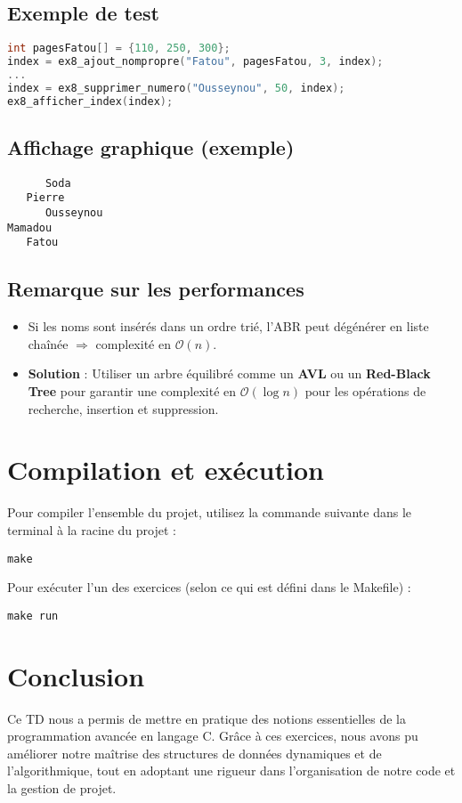 \documentclass[a4paper,12pt]{article}
\begin{document}
\subsection*{Exemple de test}

\begin{lstlisting}[language=C]
int pagesFatou[] = {110, 250, 300};
index = ex8_ajout_nompropre("Fatou", pagesFatou, 3, index);
...
index = ex8_supprimer_numero("Ousseynou", 50, index);
ex8_afficher_index(index);
\end{lstlisting}

\subsection*{Affichage graphique (exemple)}

\begin{verbatim}
      Soda
   Pierre
      Ousseynou
Mamadou
   Fatou
\end{verbatim}

\subsection*{Remarque sur les performances}

\begin{itemize}
    \item Si les noms sont insérés dans un ordre trié, l’ABR peut dégénérer en liste chaînée $\Rightarrow$ complexité en $\mathcal{O}(n)$.
    \item \textbf{Solution} : Utiliser un arbre équilibré comme un \textbf{AVL} ou un \textbf{Red-Black Tree} pour garantir une complexité en $\mathcal{O}(\log n)$ pour les opérations de recherche, insertion et suppression.
\end{itemize}


\section{Compilation et exécution}
Pour compiler l’ensemble du projet, utilisez la commande suivante dans le terminal à la racine du projet :
\begin{lstlisting}
make
\end{lstlisting}

Pour exécuter l’un des exercices (selon ce qui est défini dans le Makefile) :
\begin{lstlisting}
make run
\end{lstlisting}

\section{Conclusion}
Ce TD nous a permis de mettre en pratique des notions essentielles de la programmation avancée en langage C. Grâce à ces exercices, nous avons pu améliorer notre maîtrise des structures de données dynamiques et de l’algorithmique, tout en adoptant une rigueur dans l'organisation de notre code et la gestion de projet.
\end{document}
